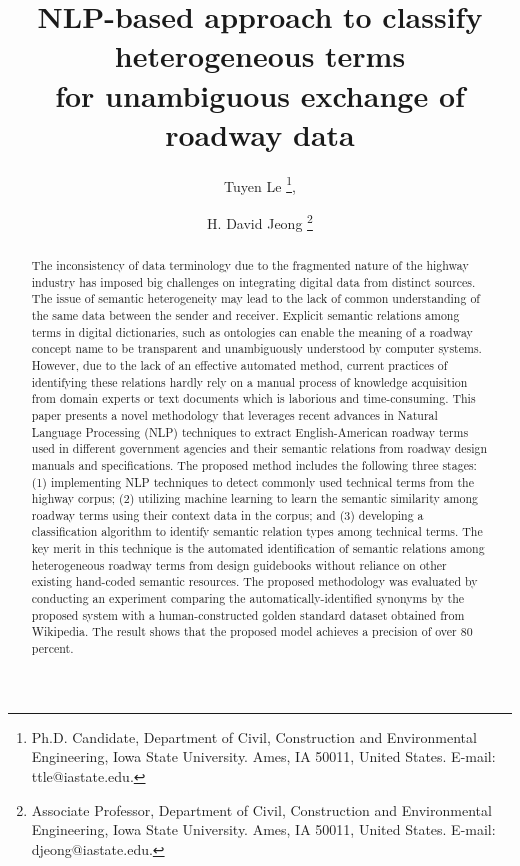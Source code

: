 \documentclass[Journal, BackFigs,NoLists, DoubleSpace]{ascelike}%
\begin{document}
\title{NLP-based approach to classify heterogeneous terms \\for unambiguous exchange of roadway data}

%
\author{
Tuyen Le
\thanks{
Ph.D. Candidate, Department of Civil, Construction and Environmental Engineering, Iowa State University. Ames, IA 50011, United States. E-mail: ttle@iastate.edu.},
\and
H. David Jeong
\thanks{Associate Professor, Department of Civil, Construction and Environmental Engineering, Iowa State University. Ames, IA 50011, United States. E-mail: djeong@iastate.edu.}
 }

\maketitle


\begin{abstract} %
The inconsistency of data terminology due to the fragmented nature of the highway industry has imposed big challenges on integrating digital data from distinct sources. The issue of semantic heterogeneity may lead to the lack of common understanding of the same data between the sender and receiver. Explicit semantic relations among terms in digital dictionaries, such as ontologies can enable the meaning of a roadway concept name to be transparent and unambiguously understood by computer systems. However, due to the lack of an effective automated method, current practices of identifying these relations hardly rely on a manual process of knowledge acquisition from domain experts or text documents which is laborious and time-consuming.
This paper presents a novel methodology that leverages recent advances in Natural Language Processing (NLP) techniques to extract English-American roadway terms used in different government agencies and their semantic relations from roadway design manuals and specifications.
The proposed method includes the following three stages: (1) implementing NLP techniques to detect commonly used technical terms from the highway corpus; (2) utilizing machine learning to learn the semantic similarity among roadway terms using their context data in the corpus; and (3) developing a classification algorithm to identify semantic relation types among technical terms.
The key merit in this technique is the automated identification of semantic relations among heterogeneous roadway terms from design guidebooks without reliance on other existing hand-coded semantic resources.
The proposed methodology was evaluated by conducting an experiment comparing the automatically-identified synonyms by the proposed system with a human-constructed golden standard dataset obtained from Wikipedia. The result shows that the proposed model achieves a precision of over 80 percent.
  
\end{abstract}
\end{document}
